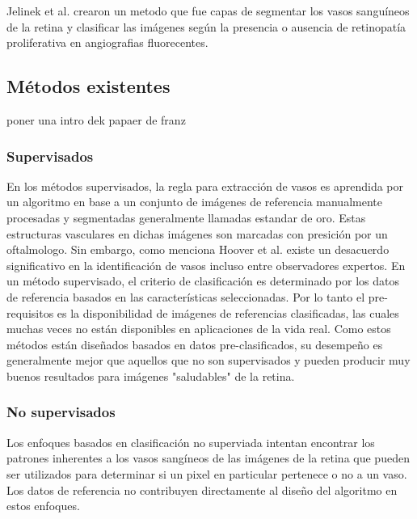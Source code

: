 Jelinek et al. \cite{jelinek2007automated} crearon un metodo que fue capas de segmentar los vasos sanguíneos de la retina y clasificar las imágenes según la presencia o ausencia de retinopatía proliferativa en angiografias fluorecentes.



	\subsection{M\'etodos existentes}

poner una intro dek papaer de franz

	\subsubsection{Supervisados}

En los m\'etodos supervisados, la regla para extracci\'on de vasos es aprendida por un algoritmo en base a un conjunto de im\'agenes de referencia manualmente procesadas y segmentadas generalmente llamadas estandar de oro. Estas estructuras vasculares en dichas im\'agenes son marcadas con presici\'on por un oftalmologo. Sin embargo, como menciona Hoover et al. \cite{hoover2000locating} existe un desacuerdo significativo en la identificaci\'on de vasos incluso entre observadores expertos. En un m\'etodo supervisado, el criterio de clasificaci\'on es determinado por los datos de referencia basados en las caracter\'isticas seleccionadas. Por lo tanto el pre-requisitos es la disponibilidad de im\'agenes de referencias clasificadas, las cuales muchas veces no est\'an disponibles en aplicaciones de la vida real. Como estos m\'etodos est\'an dise\~nados basados en datos pre-clasificados, su desempeño es generalmente mejor que aquellos que no son supervisados y pueden producir muy buenos resultados para im\'agenes "saludables" de la retina.

	\subsubsection{No supervisados}


Los enfoques basados en clasificaci\'on no superviada intentan encontrar los patrones inherentes a los vasos sang\'ineos de las im\'agenes de la retina que pueden ser utilizados para determinar si un pixel en particular pertenece o no a un vaso. Los datos de referencia no contribuyen directamente al dise\~no del algoritmo en estos enfoques.


